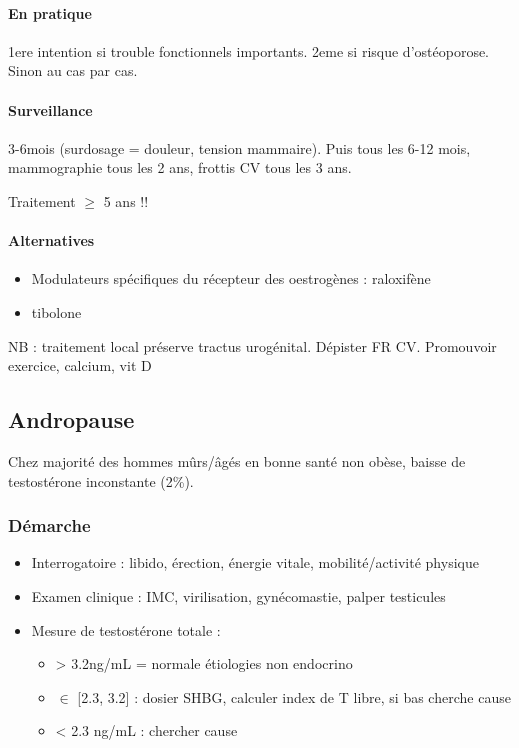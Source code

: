 \documentclass[11pt]{article}
\begin{document}
\paragraph{En pratique}
\label{sec:org02b9a90}
1ere intention si trouble fonctionnels importants. 2eme si risque
d'ostéoporose. Sinon au cas par cas.

\paragraph{Surveillance}
\label{sec:org75d085a}
3-6mois (surdosage = douleur, tension mammaire). Puis tous les 6-12 mois,
mammographie tous les 2 ans, frottis CV tous les 3 ans.

Traitement \(\ge\) 5 ans !!

\paragraph{Alternatives}
\label{sec:orgc75ec66}
\begin{itemize}
\item Modulateurs spécifiques du récepteur des oestrogènes : raloxifène
\item tibolone
\end{itemize}

NB : traitement local préserve tractus urogénital. Dépister FR CV. Promouvoir
exercice, calcium, vit D

\subsection{Andropause}
\label{sec:org9621ffe}
Chez majorité des hommes mûrs/âgés en bonne santé non obèse, baisse de
testostérone inconstante (2\%).

\subsubsection{Démarche}
\label{sec:org92cd962}
\begin{itemize}
\item Interrogatoire : libido, érection, énergie vitale, mobilité/activité physique
\item Examen clinique : IMC, virilisation, gynécomastie, palper testicules
\item Mesure de testostérone totale :
\begin{itemize}
\item > 3.2ng/mL = normale \thus étiologies non endocrino
\item \(\in\) [2.3, 3.2] : dosier SHBG, calculer index de T libre, si bas cherche cause
\item < 2.3 ng/mL : chercher cause
\end{itemize}
\end{itemize}
\end{document}
